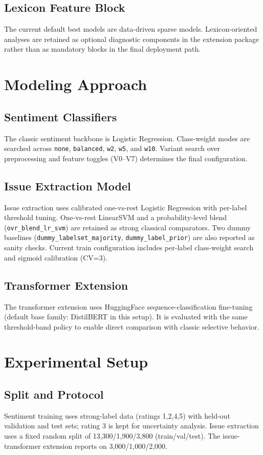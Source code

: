 \documentclass[12pt,a4paper]{article}
\begin{document}
\subsection{Lexicon Feature Block}
The current default best models are data-driven sparse models. Lexicon-oriented analyses are retained as optional diagnostic components in the extension package rather than as mandatory blocks in the final deployment path.

\section{Modeling Approach}
\subsection{Sentiment Classifiers}
The classic sentiment backbone is Logistic Regression. Class-weight modes are searched across \texttt{none}, \texttt{balanced}, \texttt{w2}, \texttt{w5}, and \texttt{w10}. Variant search over preprocessing and feature toggles (V0--V7) determines the final configuration.

\subsection{Issue Extraction Model}
Issue extraction uses calibrated one-vs-rest Logistic Regression with per-label threshold tuning. One-vs-rest LinearSVM and a probability-level blend (\texttt{ovr\_blend\_lr\_svm}) are retained as strong classical comparators. Two dummy baselines (\texttt{dummy\_labelset\_majority}, \texttt{dummy\_label\_prior}) are also reported as sanity checks. Current train configuration includes per-label class-weight search and sigmoid calibration (CV=3).

\subsection{Transformer Extension}
The transformer extension uses HuggingFace sequence-classification fine-tuning (default base family: DistilBERT in this setup). It is evaluated with the same threshold-band policy to enable direct comparison with classic selective behavior.

\section{Experimental Setup}
\subsection{Split and Protocol}
Sentiment training uses strong-label data (ratings 1,2,4,5) with held-out validation and test sets; rating 3 is kept for uncertainty analysis. Issue extraction uses a fixed random split of 13,300/1,900/3,800 (train/val/test). The issue-transformer extension reports on 3,000/1,000/2,000.
\end{document}
